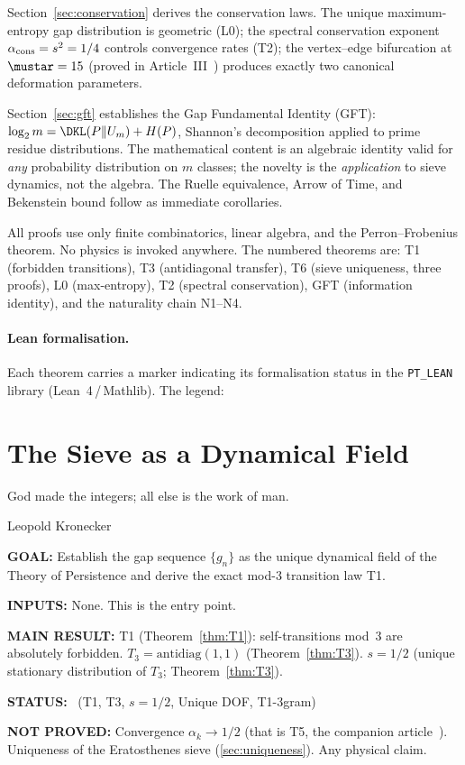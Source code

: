 \documentclass[12pt,a4paper]{article}
\begin{document}
Section~\ref{sec:conservation} derives the conservation laws.  The
unique maximum-entropy gap distribution is geometric (L0); the spectral
conservation exponent $\alpha_{\rm cons} = s^2 = 1/4$ controls
convergence rates (T2); the vertex--edge bifurcation at $\mustar = 15$
(proved in Article~III~\cite{companion_M3})
produces exactly two canonical deformation parameters.

Section~\ref{sec:gft} establishes the Gap Fundamental Identity (GFT):
$\log_2 m = \DKL(P\|U_m) + H(P)$, Shannon's decomposition applied to
prime residue distributions.  The mathematical content is an algebraic
identity valid for \emph{any} probability distribution on $m$ classes;
the novelty is the \emph{application} to sieve dynamics, not the
algebra.  The Ruelle equivalence, Arrow of Time, and Bekenstein bound
follow as immediate corollaries.

All proofs use only finite combinatorics, linear algebra, and the
Perron--Frobenius theorem.  No physics is invoked anywhere.  The
numbered theorems are: T1 (forbidden transitions), T3 (antidiagonal
transfer), T6 (sieve uniqueness, three proofs), L0 (max-entropy),
T2 (spectral conservation), GFT (information identity), and the
naturality chain N1--N4.

\paragraph{Lean formalisation.}
Each theorem carries a marker indicating its formalisation status in
the \texttt{PT\_LEAN} library (Lean~4\,/\,Mathlib). The legend:
\leanLegend{}


\section{The Sieve as a Dynamical Field}
\label{sec:sieve}

\epigraph{God made the integers; all else is the work of man.}{Leopold Kronecker}

\begin{statusbox}
\textbf{GOAL:}
  Establish the gap sequence $\{g_n\}$ as the unique dynamical field
  of the Theory of Persistence and derive the exact mod-3 transition law T1.

\textbf{INPUTS:}
  None. This is the entry point.

\textbf{MAIN RESULT:}
  T1 (Theorem~\ref{thm:T1}): self-transitions mod~3 are absolutely forbidden.
  $T_3 = \mathrm{antidiag}(1,1)$ (Theorem~\ref{thm:T3}).
  $s = 1/2$ (unique stationary distribution of $T_3$; Theorem~\ref{thm:T3}).

\textbf{STATUS:}
  \THMTAG~(T1, T3, $s = 1/2$, Unique DOF, T1-3gram)

\textbf{NOT PROVED:}
  Convergence $\alpha_k \to 1/2$ (that is T5, the companion article~\cite{companion_M3}).
  Uniqueness of the Eratosthenes sieve (\cref{sec:uniqueness}).
  Any physical claim.
\end{statusbox}
\end{document}

